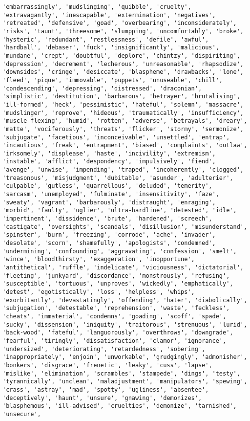 \documentclass[11pt]{article}
\begin{document}
\begin{Verbatim}[commandchars=\\\{\}]
'embarrassingly', 'mudslinging', 'quibble', 'cruelty', 'extravagantly', 'inescapable', 'extermination', 'negatives', 'retreated', 'defensive', 'goad', 'overbearing', 'inconsiderately', 'risks', 'taunt', 'threesome', 'slumpping', 'uncomfortably', 'broke', 'hysteric', 'redundant', 'restlessness', 'defile', 'awful', 'hardball', 'debaser', 'fuck', 'insignificantly', 'malicious', 'mundane', 'crept', 'doubtful', 'deplore', 'chintzy', 'dispiriting', 'depression', 'decrement', 'lecherous', 'unreasonable', 'rhapsodize', 'downsides', 'cringe', 'desiccate', 'blaspheme', 'drawbacks', 'lone', 'fleed', 'pique', 'immovable', 'puppets', 'unuseable', 'chill', 'condescending', 'depressing', 'distressed', 'draconian', 'simplistic', 'destitution', 'barbarous', 'betrayer', 'brutalising', 'ill-formed', 'heck', 'pessimistic', 'hateful', 'solemn', 'massacre', 'mudslinger', 'reprove', 'hideous', 'traumatically', 'insufficiency', 'muscle-flexing', 'humid', 'rotten', 'adverse', 'betrayals', 'dreary', 'matte', 'vociferously', 'threats', 'flicker', 'stormy', 'sermonize', 'subjugate', 'facetious', 'inconceivable', 'unsettled', 'entrap', 'incautious', 'freak', 'entrapment', 'biased', 'complaints', 'outlaw', 'irksomely', 'displease', 'haste', 'incivility', 'extremism', 'instable', 'afflict', 'despondency', 'impulsively', 'fiend', 'avenge', 'unwise', 'impending', 'traped', 'incoherently', 'clogged', 'treasonous', 'misjudgment', 'dubitable', 'asunder', 'adulterier', 'culpable', 'gutless', 'quarrellous', 'deluded', 'temerity', 'sarcasm', 'unemployed', 'fulminate', 'insensitivity', 'faze', 'sweaty', 'vagrant', 'barbarously', 'distraught', 'enraging', 'morbid', 'faulty', 'uglier', 'ultra-hardline', 'detested', 'idle', 'impertinent', 'dissidence', 'brute', 'hardened', 'screech', 'castigate', 'oversights', 'scandals', 'disillusion', 'misunderstand', 'spinster', 'burn', 'freezing', 'corrode', 'ache', 'invader', 'desolate', 'scorn', 'shamefully', 'apologists', 'condemned', 'undermining', 'confounding', 'aggravating', 'confession', 'smelt', 'wince', 'bloodthirsty', 'exaggeration', 'inopportune', 'antithetical', 'ruffle', 'indelicate', 'viciousness', 'dictatorial', 'fleeting', 'junkyard', 'discordance', 'monstrously', 'refusing', 'susceptible', 'tortuous', 'unproves', 'wickedly', 'emphatically', 'detest', 'egotistically', 'loss', 'helpless', 'whips', 'exorbitantly', 'devastatingly', 'offending', 'hater', 'diabolically', 'subjugation', 'detestable', 'reprehension', 'waste', 'feckless', 'cheats', 'immaterial', 'condemns', 'goading', 'scoff', 'spade', 'sucky', 'dissension', 'iniquity', 'traitorous', 'strenuous', 'lurid', 'back-wood', 'fateful', 'languorously', 'overthrows', 'downgrade', 'fearful', 'tiringly', 'dissatisfaction', 'clamor', 'ignorance', 'undersized', 'deteriorating', 'retardedness', 'sobering', 'inappropriately', 'enjoin', 'unworkable', 'grudgingly', 'admonisher', 'bonkers', 'disgrace', 'frenetic', 'leaky', 'cuss', 'lapse', 'mislike', 'elimination', 'scrambles', 'stampede', 'dings', 'testy', 'tyrannically', 'unclean', 'maladjustment', 'manipulators', 'spewing', 'crass', 'astray', 'mad', 'spotty', 'ugliness', 'absentee', 'deceptively', 'haunt', 'unsure', 'gnawing', 'demonizes', 'blasphemous', 'ill-advised', 'cruelties', 'demonize', 'tarnished', 'unsecure', 
\end{Verbatim}
\end{document}
